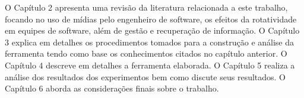 O Capítulo 2 apresenta uma revisão da literatura relacionada a este trabalho, focando no uso de mídias pelo engenheiro de software, os efeitos da rotatividade em equipes de software, além de gestão e recuperação de informação. O Capítulo 3 explica em detalhes os procedimentos tomados para a construção e análise da ferramenta tendo como base os conhecimentos citados no capítulo anterior. O Capítulo 4 descreve em detalhes a ferramenta elaborada. O Capítulo 5 realiza a análise dos resultados dos experimentos bem como discute seus resultados. O Capítulo 6 aborda as considerações finais sobre o trabalho.

